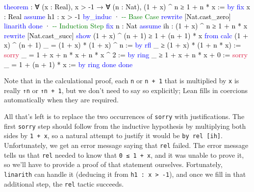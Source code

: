 \documentclass[
  letterpaper,
  DIV=11,
  numbers=noendperiod]{scrreprt}
\makeatletter
\newenvironment{Shaded}{\begin{snugshade}}{\end{snugshade}}
\newcommand{\AnnotationTok}[1]{\textcolor[rgb]{0.37,0.37,0.37}{#1}}
\newcommand{\CommentTok}[1]{\textcolor[rgb]{0.37,0.37,0.37}{#1}}
\newcommand{\ConstantTok}[1]{\textcolor[rgb]{0.56,0.35,0.01}{#1}}
\newcommand{\KeywordTok}[1]{\textcolor[rgb]{0.00,0.23,0.31}{#1}}
\newcommand{\NormalTok}[1]{\textcolor[rgb]{0.00,0.23,0.31}{#1}}
\newcommand{\SpecialCharTok}[1]{\textcolor[rgb]{0.37,0.37,0.37}{#1}}
\def\brownsquiggly{\bgroup \markoverwith{\textcolor[HTML]{B8860B}{\lower3.5\p@\hbox{\sixly \char58}}}\ULon}
\renewcommand{\NormalTok}[1]{\textcolor[HTML]{000000}{#1}}
\renewcommand{\KeywordTok}[1]{\textcolor[HTML]{0000FF}{#1}}
\renewcommand{\SpecialCharTok}[1]{}
\renewcommand{\CommentTok}[1]{\textcolor[HTML]{008000}{#1}}
\renewcommand{\ConstantTok}[1]{\textcolor[HTML]{DC143C}{#1}}
\renewcommand{\AnnotationTok}[1]{\brownsquiggly{#1}}
\theoremstyle{remark}
\makeatother
\begin{document}
\begin{Shaded}
\begin{Highlighting}[]
\KeywordTok{theorem} \SpecialCharTok{??}\AnnotationTok{Example\_6\_3\_4}\SpecialCharTok{::}\NormalTok{ : ∀ (x : Real), x \textgreater{} {-}1 →}
\NormalTok{    ∀ (n : Nat), (1 + x) \^{} n ≥ 1 + n * x := }\KeywordTok{by}
  \KeywordTok{fix}\NormalTok{ x : Real}
  \KeywordTok{assume}\NormalTok{ h1 : x \textgreater{} {-}1}
  \KeywordTok{by\_induc}
\NormalTok{  · }\CommentTok{{-}{-} Base Case}
    \KeywordTok{rewrite}\NormalTok{ [Nat.cast\_zero]}
    \KeywordTok{linarith}
    \KeywordTok{done}
\NormalTok{  · }\CommentTok{{-}{-} Induction Step}
    \KeywordTok{fix}\NormalTok{ n : Nat}
    \KeywordTok{assume}\NormalTok{ ih : (1 + x) \^{} n ≥ 1 + n * x}
    \KeywordTok{rewrite}\NormalTok{ [Nat.cast\_succ]}
    \KeywordTok{show}\NormalTok{ (1 + x) \^{} (n + 1) ≥ 1 + (n + 1) * x }\KeywordTok{from}
      \KeywordTok{calc}\NormalTok{ (1 + x) \^{} (n + 1)}
\NormalTok{        \_ = (1 + x) * (1 + x) \^{} n := }\KeywordTok{by} \KeywordTok{rfl}
\NormalTok{        \_ ≥ (1 + x) * (1 + n * x) := }\ConstantTok{sorry}
\NormalTok{        \_ = 1 + x + n * x + n * x \^{} 2 := }\KeywordTok{by} \KeywordTok{ring}
\NormalTok{        \_ ≥ 1 + x + n * x + 0 := }\ConstantTok{sorry}
\NormalTok{        \_ = 1 + (n + 1) * x := }\KeywordTok{by} \KeywordTok{ring}
    \KeywordTok{done}
  \KeywordTok{done}
\end{Highlighting}
\end{Shaded}

Note that in the calculational proof, each \texttt{n} or
\texttt{n\ +\ 1} that is multiplied by \texttt{x} is really \texttt{↑n}
or \texttt{↑n\ +\ 1}, but we don't need to say so explicitly; Lean fills
in coercions automatically when they are required.

All that's left is to replace the two occurrences of \texttt{sorry} with
justifications. The first \texttt{sorry} step should follow from the
inductive hypothesis by multiplying both sides by \texttt{1\ +\ x}, so a
natural attempt to justify it would be \texttt{by\ rel\ {[}ih{]}}.
Unfortunately, we get an error message saying that \texttt{rel} failed.
The error message tells us that \texttt{rel} needed to know that
\texttt{0\ ≤\ 1\ +\ x}, and it was unable to prove it, so we'll have to
provide a proof of that statement ourselves. Fortunately,
\texttt{linarith} can handle it (deducing it from
\texttt{h1\ :\ x\ \textgreater{}\ -1}), and once we fill in that
additional step, the \texttt{rel} tactic succeeds.
\end{document}
